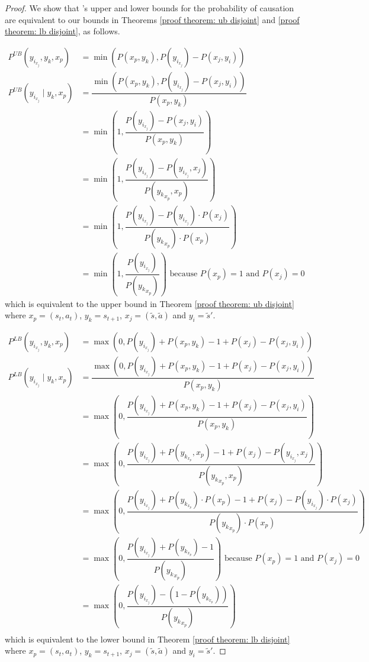 \begin{proof}
We show that \cite{li2024probabilities}'s upper and lower bounds for the probability of causation are equivalent to our bounds in Theorems \ref{proof theorem: ub disjoint} and \ref{proof theorem: lb disjoint}, as follows.

\begin{equation}
\begin{aligned}
    P^{UB}(y_{i_{x_j}}, y_k, x_p) &= \min(P(x_p, y_k), P(y_{i_{x_j}}) - P(x_j, y_i))\\
    P^{UB}(y_{i_{x_j}} \mid y_k, x_p) &= \dfrac{\min(P(x_p, y_k), P(y_{i_{x_j}}) - P(x_j, y_i))}{P(x_p, y_k)}\\
    &= \min(1, \dfrac{P(y_{i_{x_j}}) - P(x_j, y_i)}{P(x_p, y_k)})\\
    &= \min(1, \dfrac{P(y_{i_{x_j}}) - P(y_{i_{x_j}}, x_j)}{P({y_k}_{x_p}, x_p)})\\
    &= \min(1, \dfrac{P(y_{i_{x_j}}) - P(y_{i_{x_j}})\cdot P(x_j)}{P({y_k}_{x_p})\cdot P(x_p)})\\
    &= \min(1, \dfrac{P(y_{i_{x_j}})}{P({y_k}_{x_p})}) \text{ because $P(x_p) = 1$ and $P(x_j) = 0$}
\end{aligned}
\end{equation}
which is equivalent to the upper bound in Theorem \ref{proof theorem: ub disjoint} where $x_p = (s_t, a_t)$, $y_k = s_{t+1}$, $x_j = (\tilde{s}, \tilde{a})$ and $y_i = \tilde{s}'$.

\begin{equation}
\begin{aligned}
    P^{LB}(y_{i_{x_j}}, y_k, x_p) &= \max(0, P(y_{i_{x_j}}) + P(x_p, y_k) -1 + P(x_j) - P(x_j, y_i))\\
    P^{LB}(y_{i_{x_j}}\mid y_k, x_p) &= \dfrac{\max(0, P(y_{i_{x_j}}) + P(x_p, y_k) -1 + P(x_j) - P(x_j, y_i))}{P(x_p, y_k)}\\
    &= \max(0, \dfrac{P(y_{i_{x_j}}) + P(x_p, y_k) -1 + P(x_j) - P(x_j, y_i)}{P(x_p, y_k)})\\
    &= \max(0, \dfrac{P(y_{i_{x_j}}) + P(y_{k_{x_p}}, x_p) -1 + P(x_j) - P(y_{i_{x_j}}, x_j)}{P({y_k}_{x_p}, x_p)})\\
    &= \max(0, \dfrac{P(y_{i_{x_j}}) + P(y_{k_{x_p}})\cdot P(x_p) -1 + P(x_j) - P(y_{i_{x_j}})\cdot P(x_j)}{P({y_k}_{x_p})\cdot P(x_p)})\\
    &= \max(0, \dfrac{P(y_{i_{x_j}}) + P(y_{k_{x_p}}) -1}{P({y_k}_{x_p})}) \text{ because $P(x_p) = 1$ and $P(x_j) = 0$}\\
    &= \max(0, \dfrac{P(y_{i_{x_j}}) - (1 - P(y_{k_{x_p}}))}{P({y_k}_{x_p})})\\
\end{aligned}
\end{equation}
which is equivalent to the lower bound in Theorem \ref{proof theorem: lb disjoint} where $x_p = (s_t, a_t)$, $y_k = s_{t+1}$, $x_j = (\tilde{s}, \tilde{a})$ and $y_i = \tilde{s}'$.

\end{proof}

%
%
%